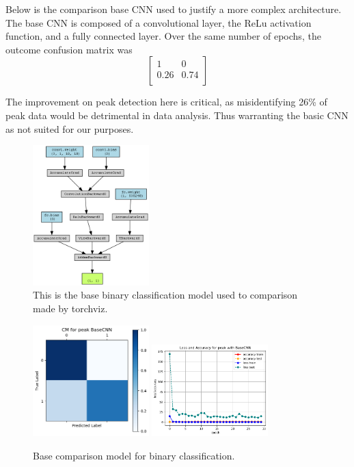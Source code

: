 \documentclass[12pt]{article}
\begin{document}
Below is the comparison base CNN used to justify a more complex architecture. The base CNN is composed of a convolutional layer, the ReLu activation function, and a fully connected layer. Over the same number of epochs, the outcome confusion matrix was 
\[
\begin{bmatrix}
    1 & 0 \\ 
    0.26 & 0.74\\
\end{bmatrix}
\]

The improvement on peak detection here is critical, as misidentifying 26\% of peak data would be detrimental in data analysis. Thus warranting the basic CNN as not suited for our purposes. \\

\begin{figure}[H]
    \centering
    \includegraphics[width=0.4\textwidth]{models/peak_base_model.png.png}
    \caption{This is the base binary classification model used to comparison made by torchviz.}
    \label{fig:base_model}
\end{figure}

\begin{figure}[H]
    \centering
    \includegraphics[width=0.4\textwidth]{confusion_matrix/binary_base_cm.png}
    \includegraphics[width=0.4\textwidth]{loss_plot/binary_base_loss.png}
    \caption{Base comparison model for binary classification.}
    \label{fig:binary_base}
\end{figure}
\end{document}
